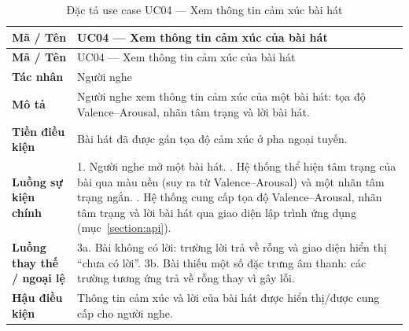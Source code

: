 \documentclass[../DoAn.tex]{subfiles}
\begin{document}
\begin{longtable}{|p{3.0cm}|p{11.0cm}|}
\caption{Đặc tả use case UC04 --- Xem thông tin cảm xúc bài hát}\label{table:uc04}\\
\hline
\textbf{Mã / Tên} & UC04 --- Xem thông tin cảm xúc của bài hát \\
\hline
\endfirsthead
\hline
\textbf{Mã / Tên} & UC04 --- Xem thông tin cảm xúc của bài hát \\
\hline
\endhead
\textbf{Tác nhân} & Người nghe \\ \hline
\textbf{Mô tả} & Người nghe xem thông tin cảm xúc của một bài hát: tọa độ Valence--Arousal, nhãn tâm trạng và lời bài hát. \\ \hline
\textbf{Tiền điều kiện} & Bài hát đã được gán tọa độ cảm xúc ở pha ngoại tuyến. \\ \hline
\textbf{Luồng sự kiện chính} & 1. Người nghe mở một bài hát. \newline 2. Hệ thống thể hiện tâm trạng của bài qua màu nền (suy ra từ Valence--Arousal) và một nhãn tâm trạng ngắn. \newline 3. Hệ thống cung cấp tọa độ Valence--Arousal, nhãn tâm trạng và lời bài hát qua giao diện lập trình ứng dụng (mục~\ref{section:api}). \\ \hline
\textbf{Luồng thay thế / ngoại lệ} & 3a. Bài không có lời: trường lời trả về rỗng và giao diện hiển thị ``chưa có lời''. \newline 3b. Bài thiếu một số đặc trưng âm thanh: các trường tương ứng trả về rỗng thay vì gây lỗi. \\ \hline
\textbf{Hậu điều kiện} & Thông tin cảm xúc và lời của bài hát được hiển thị/được cung cấp cho người nghe. \\ \hline
\end{longtable}
\end{document}
